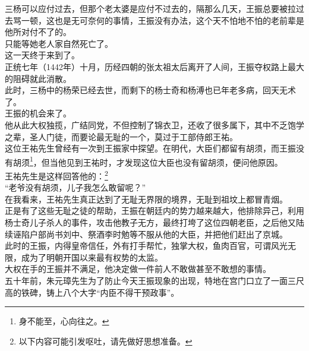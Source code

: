 \begin{multicols}{\theparacolNo}
三杨可以应付过去，但那个老太婆是应付不过去的，隔那么几天，王振总要被拉过去骂一顿，这也是无可奈何的事情，王振没有办法，这个天不怕地不怕的老前辈是他所对付不了的。\\

只能等她老人家自然死亡了。\\

这一天终于来到了。\\

正统七年（1442年）十月，历经四朝的张太祖太后离开了人间，王振夺权路上最大的阻碍就此消散。\\

此时，三杨中的杨荣已经去世，而剩下的杨士奇和杨溥也已年老多病，回天无术了。\\

王振的机会来了。\\

他从此大权独揽，广结同党，不但控制了锦衣卫，还收了很多属下，其中不乏饱学之辈，圣人门徒，而要论最无耻的一个，莫过于工部侍郎王祐。\\

这位王祐先生曾经有一次到王振家中探望。在明代，大臣们都留有胡须，而王振没有胡须\footnote{身不能至，心向往之。}，但当他见到王祐时，才发现这位大臣也没有留胡须，便问他原因。\\

王祐先生是这样回答他的：\footnote{以下内容可能引发呕吐，请先做好思想准备。}\\

“老爷没有胡须，儿子我怎么敢留呢？”\\

在我看来，王祐先生真正达到了无耻无界限的境界，无耻到祖坟上都冒青烟。\\

正是有了这些无耻之徒的帮助，王振在朝廷内的势力越来越大，他排除异己，利用杨士奇儿子杀人的事件，攻击他教子无方，最终打垮了这位四朝老臣，之后他又陆续诬陷户部尚书刘中、祭酒李时勉等不服从他的大臣，并把他们赶出了京城。\\

此时的王振，内得皇帝信任，外有打手帮忙，独掌大权，鱼肉百官，可谓风光无限，成为了明朝开国以来最有权势的太监。\\

大权在手的王振并不满足，他决定做一件前人不敢做甚至不敢想的事情。\\

五十年前，朱元璋先生为了防止今天王振现象的出现，特地在宫门口立了一面三尺高的铁碑，铸上八个大字“内臣不得干预政事”。\\


\end{multicols}
